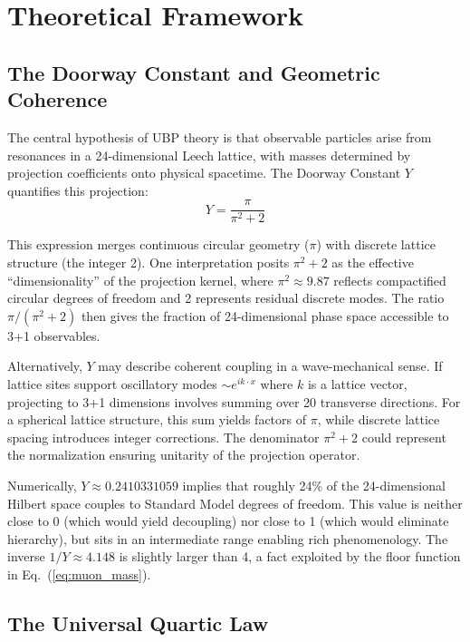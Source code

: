 \documentclass[11pt,a4paper]{article}
\begin{document}
\section{Theoretical Framework}

\subsection{The Doorway Constant and Geometric Coherence}

The central hypothesis of UBP theory is that observable particles arise from resonances in a 24-dimensional Leech lattice, with masses determined by projection coefficients onto physical spacetime. The Doorway Constant $Y$ quantifies this projection:
\begin{equation}
Y = \frac{\pi}{\pi^2 + 2}
\end{equation}

This expression merges continuous circular geometry ($\pi$) with discrete lattice structure (the integer 2). One interpretation posits $\pi^2 + 2$ as the effective ``dimensionality'' of the projection kernel, where $\pi^2 \approx 9.87$ reflects compactified circular degrees of freedom and 2 represents residual discrete modes. The ratio $\pi/(\pi^2+2)$ then gives the fraction of 24-dimensional phase space accessible to 3+1 observables.

Alternatively, $Y$ may describe coherent coupling in a wave-mechanical sense. If lattice sites support oscillatory modes $\sim e^{i k \cdot x}$ where $k$ is a lattice vector, projecting to 3+1 dimensions involves summing over 20 transverse directions. For a spherical lattice structure, this sum yields factors of $\pi$, while discrete lattice spacing introduces integer corrections. The denominator $\pi^2 + 2$ could represent the normalization ensuring unitarity of the projection operator.

Numerically, $Y \approx 0.2410331059$ implies that roughly 24\% of the 24-dimensional Hilbert space couples to Standard Model degrees of freedom. This value is neither close to 0 (which would yield decoupling) nor close to 1 (which would eliminate hierarchy), but sits in an intermediate range enabling rich phenomenology. The inverse $1/Y \approx 4.148$ is slightly larger than 4, a fact exploited by the floor function in Eq.~(\ref{eq:muon_mass}).

\subsection{The Universal Quartic Law}
\end{document}

